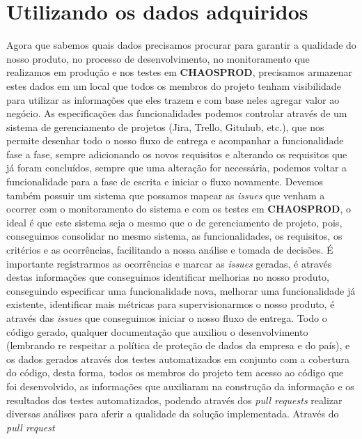     \section{Utilizando os dados adquiridos}
      Agora que sabemos quais dados precisamos procurar para garantir a qualidade
      do nosso produto, no processo de desenvolvimento, no monitoramento que
      realizamos em produção e nos testes em \textbf{CHAOSPROD}, precisamos
      armazenar estes dados em um local que todos os membros do projeto tenham
      visibilidade para utilizar as informações que eles trazem e com base neles
      agregar valor ao negócio. As especificações das funcionalidades podemos
      controlar através de um sistema de gerenciamento de projetos (Jira, Trello,
      Gituhub, etc.), que nos permite desenhar todo o nosso fluxo de entrega e
      acompanhar a funcionalidade fase a fase, sempre adicionando os novos requisitos
      e alterando os requisitos que já foram concluídos, sempre que uma alteração
      for necessária, podemos voltar a funcionalidade para a fase de escrita e
      iniciar o fluxo novamente. Devemos também possuir um sistema que possamos
      mapear as \textit{issues} que venham a ocorrer com o monitoramento do sistema
      e com os testes em \textbf{CHAOSPROD}, o ideal é que este sistema seja o
      mesmo que o de gerenciamento de projeto, pois, conseguimos consolidar no
      mesmo sistema, as funcionalidades, os requisitos, os critérios e as
      ocorrências, facilitando a nossa análise e tomada de decisões. É importante
      registrarmos as ocorrências e marcar as \textit{issues} geradas, é
      através destas informações que conseguimos identificar melhorias no nosso
      produto, conseguindo especificar uma funcionalidade nova, melhorar uma
      funcionalidade já existente, identificar mais métricas para supervisionarmos
      o nosso produto, é através das \textit{issues} que conseguimos iniciar o
      nosso fluxo de entrega. \newline
      Todo o código gerado, qualquer documentação que auxiliou o desenvolvimento
      (lembrando re respeitar a política de proteção de dados da empresa e do
      país), e os dados gerados através dos testes automatizados em conjunto
      com a cobertura do código, desta forma, todos os membros do projeto tem
      acesso ao código que foi desenvolvido, as informações que auxiliaram na
      construção da informação e os resultados dos testes automatizados, podendo
      através dos \textit{pull requests} realizar diversas análises para aferir
      a qualidade da solução implementada. Através do \textit{pull request}
